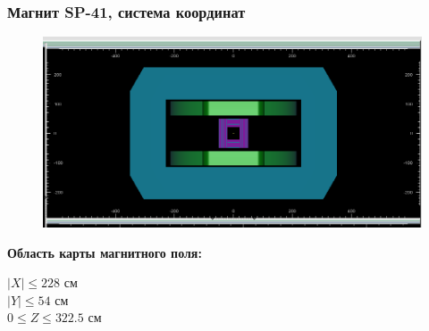 \documentclass[svgnames] {beamer}
\begin{document}
\begin{frame}
  \frametitle{Магнит SP-41, система координат}
  \begin{block}{}
    \begin{figure}[H]
      \includegraphics[width=0.8\linewidth]{bmn_magnetGeom.png}
    \end{figure}
  \end{block}
  \begin{block}{\centering \bf Область карты магнитного поля:}
    \begin{center}
      $|X| \leq 228 $ см \\
      $|Y| \leq 54 $ см \\
      $0 \leq  Z \leq 322.5$ см
    \end{center}
  \end{block}
\end{frame}
\end{document}
